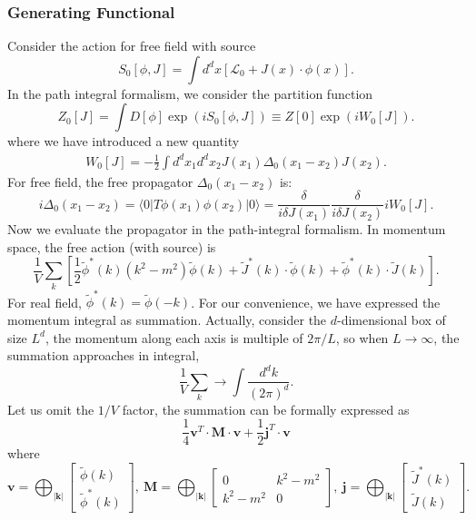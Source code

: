 \subsubsection{Generating Functional}
Consider the action for free field with source
\begin{equation}
	S_0[\phi,J]
	= \int d^dx\left[\mathcal{L}_0 + J(x)\cdot\phi(x) \right].
\end{equation}
In the path integral formalism, we consider the partition function 
\begin{equation}
	Z_0[J] = \int D[\phi] \exp(iS_0[\phi,J])
	\equiv Z[0] \exp(iW_0[J]).
\end{equation}
where we have introduced a new quantity
\begin{equation}
\begin{aligned}
	W_0[J] = -\frac{1}{2}\int d^dx_1 d^dx_2 J(x_1)\Delta_0(x_1-x_2)J(x_2).
\end{aligned}
\end{equation}
For free field, the free propagator $\Delta_0(x_1-x_2)$ is:
\begin{equation}
	i\Delta_0(x_1-x_2) = \langle 0| T\phi(x_1)\phi(x_2)|0\rangle
	= \frac{\delta}{i\delta J(x_1)}\frac{\delta}{i\delta J(x_2)} iW_0[J].
\end{equation}
Now we evaluate the propagator in the path-integral formalism.
In momentum space, the free action (with source) is 
\begin{equation*}
	\frac{1}{V}\sum_k \left[\frac{1}{2}\tilde\phi^*(k)( k^2-m^2)\tilde\phi(k)+\tilde J^*(k)\cdot\tilde\phi(k)+\tilde\phi^*(k)\cdot\tilde J(k)\right].
\end{equation*}
For real field, $\tilde\phi^*(k) = \tilde\phi(-k)$.
For our convenience, we have expressed the momentum integral as summation.
Actually, consider the $d$-dimensional box of size $L^d$, the momentum along each axis is multiple of $2\pi/L$, so when $L\rightarrow \infty$, the summation approaches in integral,
\begin{equation*}
	\frac{1}{V}\sum_k \rightarrow \int \frac{d^d k}{(2\pi)^d}.
\end{equation*}
Let us omit the $1/V$ factor, the summation can be formally expressed as
\begin{equation}
	\frac{1}{4}\mathbf{v}^T \cdot \mathbf M\cdot \mathbf{v} + \frac{1}{2}\mathbf{j}^T \cdot \mathbf{v}
\end{equation}
where
\begin{equation*}
	\mathbf v = \bigoplus_{|\mathbf k|} \left[
	\begin{array}{c}
		\tilde{\phi}(k) \\ 
		\tilde{\phi}^*(k) 
	\end{array}\right],\ 
	\mathbf M = \bigoplus_{|\mathbf k|} \left[
	\begin{array}{cc} 
		0 & k^2-m^2 \\ 
		k^2-m^2 & 0 
	\end{array}\right],\ 
	\mathbf j = \bigoplus_{|\mathbf k|} \left[
	\begin{array}{c}
		\tilde{J}^*(k) \\ 
		\tilde{J}(k) 
	\end{array}\right].
\end{equation*}
